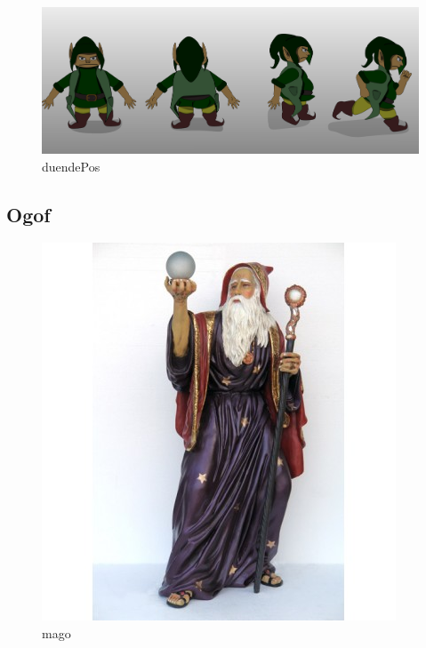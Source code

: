 \begin{figure}[htb]
	\caption{\label{duendePos}duendePos}
	\begin{center}
	    \includegraphics[width=\textwidth]{imagens/duendePosições.jpeg}
	\end{center}
\end{figure}



\subsection{Ogof}
\begin{figure}[htb]
	\caption{\label{mago}mago}
	\begin{center}
	    \includegraphics[width=\textwidth/2]{imagens/mago.jpg}
	\end{center}
\end{figure}

